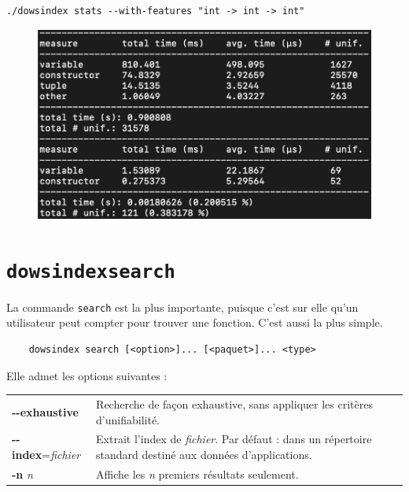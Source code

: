 \documentclass[a4paper]{report}
\theoremstyle{definition}
\newcommand{\dowsindex}{\texttt{dowsindex}\xspace}
\begin{document}
\begin{verbatim}
./dowsindex stats --with-features "int -> int -> int"
\end{verbatim}

\begin{figure}[h]
	\begin{center}
		\includegraphics[scale=0.22]{images/dowsindex-save}
	\end{center}
	\caption{\label{fig_dowsindex_save}}
\end{figure}


\section{\dowsindex \texttt{search}}

La commande \texttt{search} est la plus importante, puisque c'est sur elle qu'un utilisateur peut compter pour trouver une fonction. C'est aussi la plus simple.

\begin{center}
	\begin{verbatim}
	dowsindex search [<option>]... [<paquet>]... <type>
	\end{verbatim}
\end{center}

Elle admet les options suivantes :

\begin{table}[h]
	\begin{tabularx}{\textwidth}{lX}
			\textbf{-{}-exhaustive} &
			Recherche de façon exhaustive, sans appliquer les critères d'unifiabilité.
		\\
			\textbf{-{}-index}=\textit{fichier} &
			Extrait l'index de \textit{fichier}. Par défaut : dans un répertoire standard destiné aux données d'applications.
		\\
			\textbf{-n} \textit{n} &
			Affiche les \textit{n} premiers résultats seulement.
	\end{tabularx}
\end{table}
\end{document}

